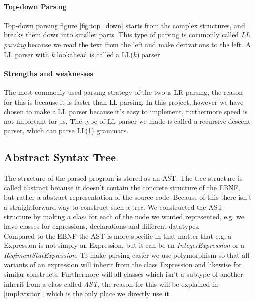 	\paragraph{Top-down Parsing}
		Top-down parsing figure \ref{fig:top_down} starts from the complex structures, and breaks them down into smaller parts.
		This type of parsing is commonly called {\it LL parsing} because we read the text from the left and make derivations to the left.
		A LL parser with $k$ lookahead is called a LL($k$) parser.
	\paragraph{Strengths and weaknesses}
		The most commonly used parsing strategy of the two is LR parsing, the reason for this is because it is faster than LL parsing.
		In this project, however we have chosen to make a LL parser because it's easy to implement, furthermore speed is not important for us. 
		The type of LL parser we made is called a recursive descent parser, which can parse LL(1) grammars.
		
	\subsection{Abstract Syntax Tree}
		\label{ast}
		The structure of the parsed program is stored as an AST. The tree structure is called abstract because it doesn't contain the concrete
		structure of the EBNF, but rather a abstract representation of the source code. Because of this there isn't a straightforward way to 
		construct such a tree.  We constructed the AST-structure by making a class for each of the node we wanted represented, e.g. we have 
		classes for expressions, declarations and different datatypes. \\
		
		Compared to the EBNF the AST is more specific in that matter that e.g. a Expression 
		is not simply an Expression, but it can be an {\it IntegerExpression} or a {\it RegimentStatExpression}. 
		To make parsing easier we use polymorphism so that all variants of an expression 
		will inherit from the class Expression and likewise for similar constructs. 
		Furthermore will all classes which isn't a subtype of another inherit from a class called {\it AST}, 
		the reason for this will be explained in \ref{impl:visitor}, which is the only place we directly use it.
		
